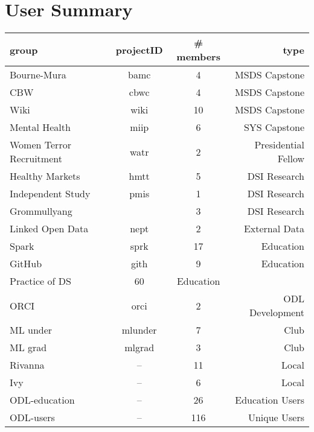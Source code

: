 \section{User Summary}
\begin{center}
\begin{tabular}{lccr}
\hline
\hline
group & projectID & \# members & type \\
\hline
\hline
Bourne-Mura & bamc & 4 & MSDS Capstone \\
CBW & cbwc & 4 & MSDS Capstone\\
Wiki & wiki & 10 & MSDS Capstone\\
Mental Health & miip & 6 & SYS Capstone\\
\hline
Women Terror Recruitment & watr & 2 & Presidential Fellow\\
\hline
Healthy Markets & hmtt & 5 & DSI Research\\
Independent Study & pmis & 1 & DSI Research\\
Grommullyang & & 3 & DSI Research\\
\hline
Linked Open Data   & nept & 2 & External Data\\
\hline
Spark & sprk & 17 & Education \\
GitHub & gith & 9 & Education \\
Practice of DS & 60 & Education \\ 
\hline
ORCI & orci & 2 & ODL Development\\
\hline
ML under & mlunder & 7 & Club\\
ML grad & mlgrad & 3 & Club\\
\hline
Rivanna & -- & 11 & Local\\
Ivy & -- & 6 & Local\\
\hline
\hline
ODL-education  & -- & 26 & Education Users\\
ODL-users & -- & 116 & Unique Users\\
\hline
\hline
\end{tabular}
\end{center}

